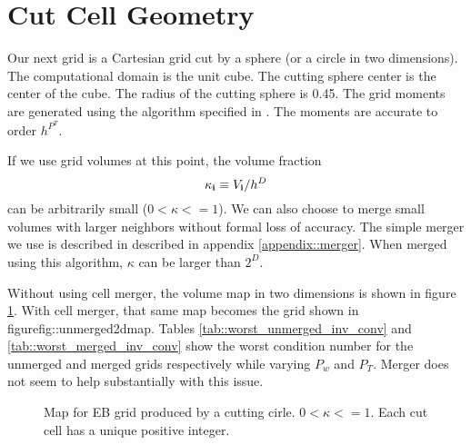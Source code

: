 \documentclass{article}
\newcommand{\ibold}{{\bf i}}
\begin{document}
\section{Cut Cell Geometry}
\label{sec::eb}

Our next  grid is a Cartesian grid cut  by a sphere (or a circle in two
dimensions). The computational domain is the unit cube.   The cutting
sphere center is the center of the cube.   The radius of the cutting
sphere is 0.45.  The grid moments are generated using the algorithm
specified in \cite{Schwartz2015}.  The moments are accurate to
order $h^{P^T}$.

If we use grid volumes at this point, the volume fraction
\begin{equation*}
\kappa_\ibold \equiv V_\ibold/h^D 
\end{equation*}
can be arbitrarily small ($ 0 < \kappa <= 1$).   We can also choose to
merge small volumes with larger neighbors without formal loss of
accuracy. The simple merger we use is described in
described in appendix \ref{appendix::merger}.
When merged using this algorithm, $\kappa$ can be larger than $2^D$.

Without using cell merger, the volume map in two dimensions is shown
in figure \ref{fig::unmerged2dmap}.   With cell merger, that same map
becomes the grid shown in figure{fig::unmerged2dmap}.
Tables \ref{tab::worst_unmerged_inv_conv} and
\ref{tab::worst_merged_inv_conv}
show the worst condition number for the unmerged and merged  grids
respectively while varying $P_w$ and $P_T$.   Merger does not seem to
help substantially with this issue.


\begin{figure}
\centerline{} 
\caption
    {
      Map for EB grid produced by a cutting cirle. $0 <  \kappa <= 1$.
  Each cut cell has a unique positive integer.}
\label{fig::unmerged2dmap}
\end{figure}
\end{document}
